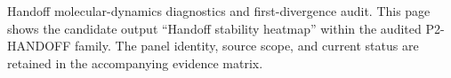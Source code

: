 Handoff molecular-dynamics diagnostics and first-divergence audit. This page shows the candidate output ``Handoff stability heatmap'' within the audited P2-HANDOFF family. The panel identity, source scope, and current status are retained in the accompanying evidence matrix.
